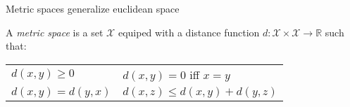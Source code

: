\begin{frame}[fragile]{Metric spaces generalize euclidean space}
{\begin{tikzpicture}[dot/.style={circle,inner sep=2pt,fill,name=#1},
    extended line/.style={shorten >=-#1,shorten <=-#1},
    extended line/.default=1cm]
\end{tikzpicture}
}
\begin{defn}
A \emph{metric space} is a set $\mathcal{X}$ equiped with a distance function $d : \mathcal{X} \times \mathcal{X} \rightarrow \mathbb{R}$ such that:
\begin{center}
\begin{tabular}{ll}
$d(x,y) \ge 0$ & $d(x,y) = 0$ iff $x=y$ \\
$d(x,y) = d(y,x)$ & $d(x,z) \le d(x,y) + d(y,z)$ \\
\end{tabular}
\end{center}
\end{defn}
\end{frame}

